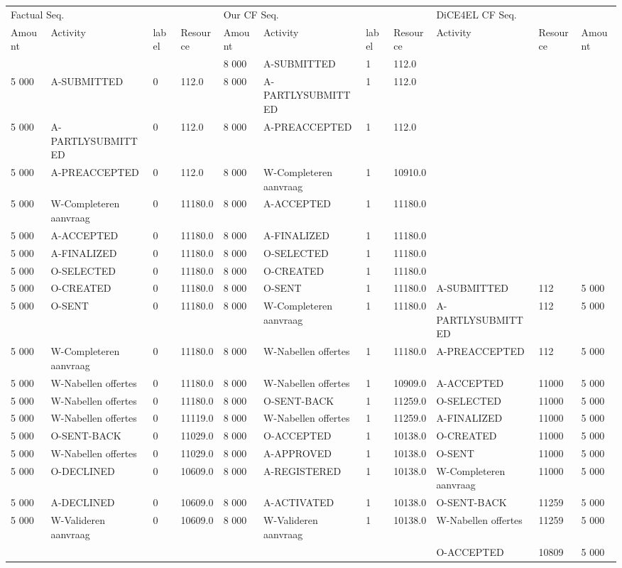 \begin{tabular}{lllllllllll}
\toprule
\multicolumn{4}{l}{Factual Seq.} & \multicolumn{4}{l}{Our CF Seq.} & \multicolumn{3}{l}{DiCE4EL CF Seq.} \\
Amount & Activity & label & Resource & Amount & Activity & label & Resource & Activity & Resource & Amount \\
\midrule
 &  &  &  & 8 000 & A-SUBMITTED & 1 & 112.0 &  &  &  \\
5 000 & A-SUBMITTED & 0 & 112.0 & 8 000 & A-PARTLYSUBMITTED & 1 & 112.0 &  &  &  \\
5 000 & A-PARTLYSUBMITTED & 0 & 112.0 & 8 000 & A-PREACCEPTED & 1 & 112.0 &  &  &  \\
5 000 & A-PREACCEPTED & 0 & 112.0 & 8 000 & W-Completeren aanvraag & 1 & 10910.0 &  &  &  \\
5 000 & W-Completeren aanvraag & 0 & 11180.0 & 8 000 & A-ACCEPTED & 1 & 11180.0 &  &  &  \\
5 000 & A-ACCEPTED & 0 & 11180.0 & 8 000 & A-FINALIZED & 1 & 11180.0 &  &  &  \\
5 000 & A-FINALIZED & 0 & 11180.0 & 8 000 & O-SELECTED & 1 & 11180.0 &  &  &  \\
5 000 & O-SELECTED & 0 & 11180.0 & 8 000 & O-CREATED & 1 & 11180.0 &  &  &  \\
5 000 & O-CREATED & 0 & 11180.0 & 8 000 & O-SENT & 1 & 11180.0 & A-SUBMITTED & 112 & 5 000 \\
5 000 & O-SENT & 0 & 11180.0 & 8 000 & W-Completeren aanvraag & 1 & 11180.0 & A-PARTLYSUBMITTED & 112 & 5 000 \\
5 000 & W-Completeren aanvraag & 0 & 11180.0 & 8 000 & W-Nabellen offertes & 1 & 11180.0 & A-PREACCEPTED & 112 & 5 000 \\
5 000 & W-Nabellen offertes & 0 & 11180.0 & 8 000 & W-Nabellen offertes & 1 & 10909.0 & A-ACCEPTED & 11000 & 5 000 \\
5 000 & W-Nabellen offertes & 0 & 11180.0 & 8 000 & O-SENT-BACK & 1 & 11259.0 & O-SELECTED & 11000 & 5 000 \\
5 000 & W-Nabellen offertes & 0 & 11119.0 & 8 000 & W-Nabellen offertes & 1 & 11259.0 & A-FINALIZED & 11000 & 5 000 \\
5 000 & O-SENT-BACK & 0 & 11029.0 & 8 000 & O-ACCEPTED & 1 & 10138.0 & O-CREATED & 11000 & 5 000 \\
5 000 & W-Nabellen offertes & 0 & 11029.0 & 8 000 & A-APPROVED & 1 & 10138.0 & O-SENT & 11000 & 5 000 \\
5 000 & O-DECLINED & 0 & 10609.0 & 8 000 & A-REGISTERED & 1 & 10138.0 & W-Completeren aanvraag & 11000 & 5 000 \\
5 000 & A-DECLINED & 0 & 10609.0 & 8 000 & A-ACTIVATED & 1 & 10138.0 & O-SENT-BACK & 11259 & 5 000 \\
5 000 & W-Valideren aanvraag & 0 & 10609.0 & 8 000 & W-Valideren aanvraag & 1 & 10138.0 & W-Nabellen offertes & 11259 & 5 000 \\
 &  &  &  &  &  &  &  & O-ACCEPTED & 10809 & 5 000 \\
\bottomrule
\end{tabular}
